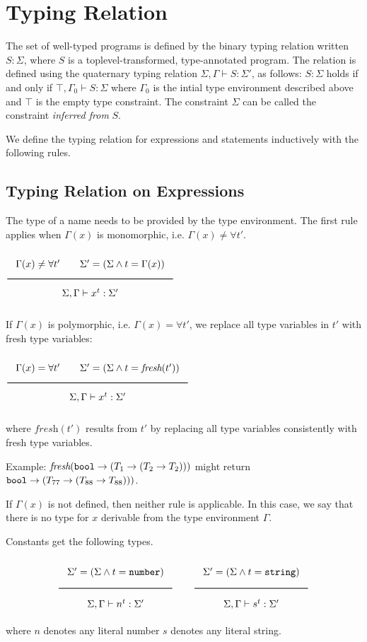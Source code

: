 \section{Typing Relation}

The set of well-typed programs is defined by the binary typing relation
written $S: \Sigma$, where $S$ is a toplevel-transformed, type-annotated program.
The relation is defined using the quaternary typing relation
$\Sigma, \Gamma \vdash S : \Sigma'$, as follows:
$S: \Sigma$ holds if and only if 
$\top, \Gamma_0 \vdash S : \Sigma$
where $\Gamma_0$ is the intial type environment described above and $\top$ is the empty
type constraint. The constraint $\Sigma$ can be called the constraint \emph{inferred from}
$S$. 

We define the typing relation for expressions and statements
inductively with the following rules.

\subsection{Typing Relation on Expressions}

The type of a name needs to be provided by the type environment. The first rule
applies when $\Gamma(x)$ is monomorphic, i.e. $\Gamma(x) \neq \forall t'$.

\noindent
$\Rule{\Gamma(x) \neq \forall t' \qquad
  \Sigma' = (\Sigma \wedge t = \Gamma(x))}{\Sigma, \Gamma \vdash x^t : \Sigma'}$

If $\Gamma(x)$ is polymorphic,  i.e. $\Gamma(x) = \forall t'$, we replace all type variables in
$t'$ with fresh type variables:

\noindent
$\Rule{\Gamma(x) = \forall t' \qquad
  \Sigma' = (\Sigma \wedge t = \textit{fresh}(t'))}{\Sigma, \Gamma \vdash x^t : \Sigma'}$

\noindent
where $\textit{fresh}(t')$ results from $t'$ by replacing all type variables consistently with
fresh type variables.

Example: $\textit{fresh}(\texttt{bool} \rightarrow (T_1 \rightarrow (T_2 \rightarrow T_2)))$
might return $\texttt{bool} \rightarrow (T_{77} \rightarrow (T_{88} \rightarrow T_{88})))$.

If $\Gamma(x)$ is not defined, then neither rule is applicable.
In this case, we say that
there is no type for $x$ derivable from the type environment $\Gamma$. 

Constants get the following types.

\noindent
\[
  \Rule{\Sigma' = (\Sigma \wedge t = \Number)}{\Sigma, \Gamma \vdash n^t : \Sigma'}
  \qquad
  \Rule{\Sigma' = (\Sigma \wedge t = \String)}{\Sigma, \Gamma \vdash s^t : \Sigma'}
\]
\noindent
where $n$ denotes any literal number $s$ denotes any literal string.


